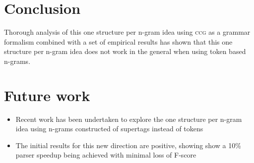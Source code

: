\documentclass[portrait]{usydposter}
\newcommand{\acronym}[1]{\textsc{#1}\xspace}
\newcommand{\ngram}{n-gram\xspace}
\newcommand{\ngrams}{{\ngram}s\xspace}
\newcommand{\ccg}{\acronym{ccg}}
\begin{document}
\begin{multicols}{3}


\section{Conclusion}
Thorough analysis of this one structure per \ngram idea using \ccg as a grammar formalism combined with a set of empirical results has shown that this one structure per \ngram idea does not work in the general when using token based \ngrams. 


\section{Future work}
\begin{itemize}
  \item Recent work has been undertaken to explore the one structure per \ngram idea using \ngrams constructed of supertags instead of tokens
  \item The initial results for this new direction are positive, showing show a 10\% parser speedup being achieved with minimal loss of F-score
\end{itemize}




\end{multicols}
\end{document}
